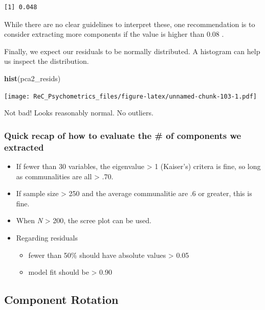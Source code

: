 \documentclass[
  english,
]{book}
\newenvironment{Shaded}{\begin{snugshade}}{\end{snugshade}}
\newcommand{\KeywordTok}[1]{\textcolor[rgb]{0.13,0.29,0.53}{\textbf{#1}}}
\newcommand{\NormalTok}[1]{#1}
\providecommand{\tightlist}{%
  \setlength{\itemsep}{0pt}\setlength{\parskip}{0pt}}
\begin{document}
\begin{verbatim}
[1] 0.048
\end{verbatim}

While there are no clear guidelines to interpret these, one recommendation is to consider extracting more components if the value is higher than 0.08 \citep{field_discovering_2012}.

Finally, we expect our residuals to be normally distributed. A histogram can help us inspect the distribution.

\begin{Shaded}
\begin{Highlighting}[]
\KeywordTok{hist}\NormalTok{(pca2_resids)}
\end{Highlighting}
\end{Shaded}

\texttt{[image: ReC\_Psychometrics\_files/figure-latex/unnamed-chunk-103-1.pdf]}

Not bad! Looks reasonably normal. No outliers.

\hypertarget{quick-recap-of-how-to-evaluate-the-of-components-we-extracted}{%
\subsubsection{Quick recap of how to evaluate the \# of components we extracted}\label{quick-recap-of-how-to-evaluate-the-of-components-we-extracted}}

\begin{itemize}
\tightlist
\item
  If fewer than 30 variables, the eigenvalue \textgreater{} 1 (Kaiser's) critera is fine, so long as communalities are all \textgreater{} .70.
\item
  If sample size \textgreater{} 250 and the average communalitie are .6 or greater, this is fine.
\item
  When \emph{N} \textgreater{} 200, the scree plot can be used.
\item
  Regarding residuals

  \begin{itemize}
  \tightlist
  \item
    fewer than 50\% should have absolute values \textgreater{} 0.05
  \item
    model fit should be \textgreater{} 0.90
  \end{itemize}
\end{itemize}

\hypertarget{component-rotation}{%
\subsection{Component Rotation}\label{component-rotation}}
\end{document}
